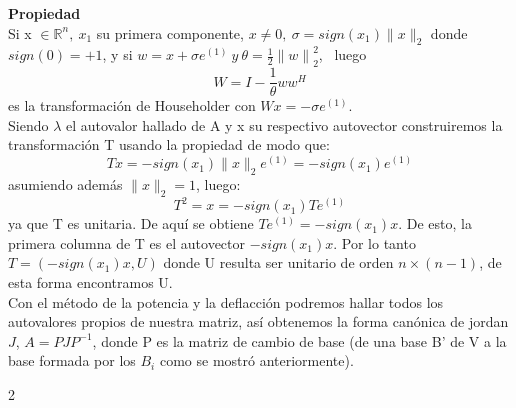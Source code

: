 \documentclass[12pt,a4paper]{article}
\begin{document}
\begin{multicols}{2}
\noindent\textbf{Propiedad}\\
\noindent Si x $\in\mathbb{R}^n, \ x_{1}$ su primera componente, $x\neq 0,\ \sigma=sign(x_{1})\|x\|_{2}$ donde $sign(0)=+1$, y si $w=x+\sigma e^{(1)} \ y \ \theta=\frac{1}{2}{\|w\|}^{2}_{2}$, \ luego $$W=I-\frac{1}{\theta}ww^{H}$$ es la transformación de Householder con $Wx=-\sigma e^{(1)}$.\\
Siendo $\lambda$ el autovalor hallado de A y x su respectivo autovector construiremos la transformación T usando la propiedad de modo que:  $$Tx=-sign(x_{1})\|x\|_{2}e^{(1)}=-sign(x_{1})e^{(1)}$$ asumiendo además $\|x\|_{2}=1$, luego:\\
$$T^{2}=x=-sign(x_{1})Te^{(1)}$$ya que T es unitaria. De aquí se obtiene $Te^{(1)}=-sign(x_{1})x$. De esto, la primera columna de T es el autovector $-sign(x_{1})x$. Por lo tanto $T=(-sign(x_{1})x,U)$ donde U resulta ser unitario de orden $n\times(n-1)$, de esta forma encontramos U. \\

\noindent Con el método de la potencia y la deflacción podremos hallar todos los autovalores propios de nuestra matriz, así obtenemos la forma canónica de jordan $J$, $A=PJP^{-1}$, donde P es la matriz de cambio de base (de una base B' de V a la base formada por los $B_{i}$ como se mostró anteriormente).\\


\end{multicols}{2}
\newpage
\end{document}
